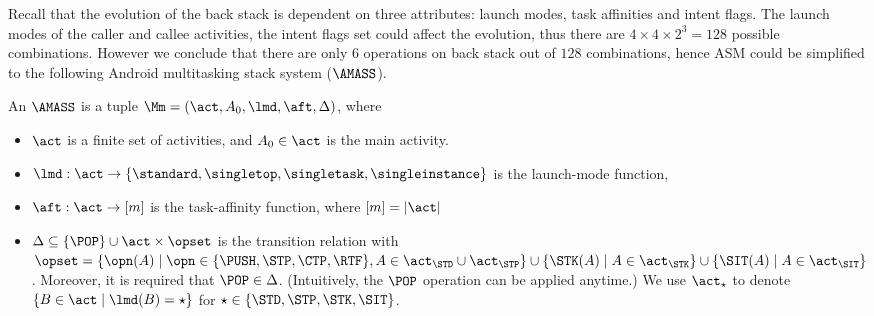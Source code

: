 Recall that the evolution of the back stack is dependent on three attributes: launch modes, task affinities and intent flags. The launch modes of the caller and callee activities, the intent flags set could affect the evolution, thus there are $4\times 4\times 2^3=128$ possible combinations.
However we conclude that there are only $6$ operations on back stack out of $128$ combinations, hence ASM could be simplified to the following Android multitasking stack system ($\AMASS$).
\begin{definition} \label{def:amass}
    An $\AMASS$ is a tuple $\Mm = (\act,A_0,\lmd,\aft,\Delta)$, where
\begin{itemize}
\item $\act$ is a finite set of activities, and $A_0 \in \act$ is the main activity.
\item $\lmd : \act \rightarrow \{\standard,\singletop,\singletask,\singleinstance\}$ is the launch-mode function,
%
\item $\aft : \act \rightarrow [m]$ is the task-affinity function, where $[m] = |\act|$
\item $\Delta \subseteq \{\POP\} \cup \act \times \opset$ is the transition relation with 
    $\opset=\{\opn(A)\mid \opn \in \{\PUSH, \STP, \CTP, \RTF\}, A \in \act_{\STD}\cup\act_{\STP}\}\cup\{\STK(A)\mid A\in\act_{\STK}\}\cup\{\SIT(A)\mid A\in\act_{\SIT}\}$. 
    Moreover, it is required that $\POP \in \Delta$. (Intuitively, the $\POP$ operation can be applied anytime.) We use $\act_{\star}$ to denote $\{B\in\act\mid \lmd(B)= \star\}$ for $\star\in\{\STD,\STP,\STK,\SIT\}$.
\end{itemize}
\end{definition}

